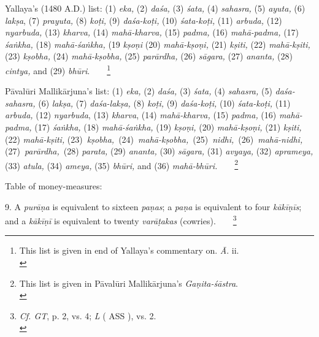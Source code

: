 \documentclass[10pt, openany]{book}
\begin{document}
{{{{{{{{{{{{{{{{{{{{\begin{sloppypar}
{Yallaya's (1480 A.D.) list: (1)  \textit{eka,} (2)  \textit{daśa,} (3)  \textit{śata,} (4)  \textit{sahasra,} (5)  \textit{ayuta,} (6)  \textit{lakṣa}, (7)  \textit{prayuta,} (8)  \textit{koṭi,} (9)  \textit{daśa-koṭi,} (10)  \textit{śata-koṭi,} (11) \textit{arbuda,} (12)  \textit{nyarbuda,} (13)  \textit{kharva,} (14)  \textit{mahā-kharva,} (15)  \textit{padma,} (16)  \textit{mahā-padma,} (17)  \textit{śaṅkha,} (18)  \textit{mahā-śaṅkha,} (19 \textit{kṣoṇi} (20)  \textit{mahā-kṣoṇi,} (21)  \textit{kṣiti,} (22) \textit{mahā-kṣiti,} (23)  \textit{kṣobha,} (24)  \textit{mahā-kṣobha,} (25)  \textit{parārdha,} (26)  \textit{sāgara,} (27)  \textit{ananta,} (28)  \textit{cintya,} and (29)  \textit {bhūri}.~~~~\renewcommand{\thefootnote}{\hspace{-4.5mm} 2}\footnote{\hspace{-2mm} \en This list is given in end of Yallaya's commentary on.  \textit{Ā}. ii.\\}
\vspace{3mm}

 Pāvalūri Mallikārjuna's list: (1)  \textit{eka,} (2)  \textit{daśa,} (3) \textit {śata,} (4)
 \textit{sahasra,}
(5)  \textit{daśa-sahasra,} (6)  \textit{lakṣa,} (7)  \textit{daśa-lakṣa,} (8)  \textit{koṭi,} (9)  \textit {daśa-koṭi,}
(10)  \textit{śata-koṭi,} (11)  \textit{arbuda,} (12)  \textit{nyarbuda}, (13)  \textit{kharva}, (14)  \textit{mahā-kharva,} (15)
 \textit{padma,}
(16)  \textit {mahā-padma,} (17) \textit {śaṅkha,} (18)  \textit {mahā-śaṅkha,} (19)  \textit{kṣoṇi,} (20)
 \textit{mahā-kṣoṇi,}
(21)  \textit{kṣiti,} (22)  \textit{mahā-kṣiti,} (23)  \,\textit{kṣobha,} \,(24)  \,\textit{mahā-kṣobha,} \,(25)  \,\textit{nidhi,} \,(26) \,\textit{mahā-nidhi,} \,(27)  \,\textit{parārdha,} \,(28)  \textit {parata,} (29)  \textit{ananta,} 
(30) \textit{sāgara,} (31)  \textit{avyaya,} (32)  \textit{aprameya,} (33)  \textit {atula,} (34)  \textit{ameya,} (35)  \textit{bhūri,} and (36) \textit{mahā-bhūri.}~~~~\renewcommand{\thefootnote}{\hspace{-4.5mm} 3}\footnote{\hspace{-2mm} \en This list is given in Pāvalūri Mallikārjuna's  \textit{Gaṇita-śāstra}.\\}}
\vspace{3mm}

Table of money-measures:
\vspace{2mm}

 9. A  \textit{purāṇa} is equivalent to sixteen \textit{paṇas}; a \textit {paṇa} is
equivalent to four  \textit{kākīṇīs}; and a  \textit{kākīṇī} is equivalent to
twenty \textit {varāṭakas} (cowries).~~~~\renewcommand{\thefootnote}{\hspace{-4.5mm} 4}\footnote{\hspace{-2mm} \en  \textit{Cf. GT}, p. 2, vs. 4;  \textit{L} ( ASS ), vs. 2.\\}
\vspace{3mm}


\end{sloppypar}}}}}}}}}}}}}}}}}}}}}
\end{document}
